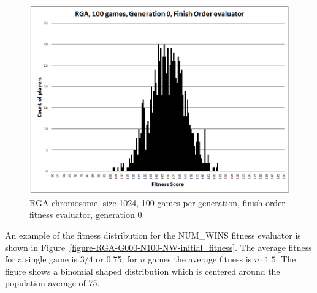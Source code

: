 \begin{figure}
\begin{minipage}[t]{0.47\linewidth}
\includegraphics[width=1.0\linewidth]{Figures/RGA_1024_G000_N100_FO.png}
\caption[RGA Finish Order Fitness Distribution, Initial Generation]{RGA
chromosome, size 1024, 100 games per generation, finish order
fitness evaluator, generation 0.}
\label{figure-RGA-G000-N100-FO-initial_fitness}
\end{minipage}
\end{figure}

An example of the fitness distribution for the NUM\_WINS fitness evaluator is
shown in Figure~\ref{figure-RGA-G000-N100-NW-initial_fitness}. The average
fitness for a single game is \(3/4\) or 0.75; for \(n\) games the average
fitness is \(n \cdot 1.5\). The figure shows a binomial shaped distribution
which is centered around the population average of 75.

